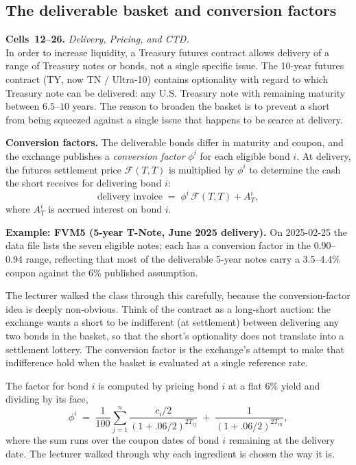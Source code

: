 \subsection{The deliverable basket and conversion factors}\label{L4-sec:tf-basket}

\begin{keyblock}
\textbf{Cells~12--26.} \emph{Delivery, Pricing, and CTD.}\\
In order to increase liquidity, a Treasury futures contract allows
delivery of a range of Treasury notes or bonds, not a single specific
issue. The 10-year futures contract (TY, now TN / Ultra-10) contains
optionality with regard to which Treasury note can be delivered: any U.S.
Treasury note with remaining maturity between $6.5$--$10$ years. The
reason to broaden the basket is to prevent a short from being squeezed
against a single issue that happens to be scarce at delivery.

\textbf{Conversion factors.} The deliverable bonds differ in maturity and
coupon, and the exchange publishes a \emph{conversion factor} $\phi^i$
for each eligible bond $i$. At delivery, the futures settlement price
$\mathcal{F}(T,T)$ is multiplied by $\phi^i$ to determine the cash the
short receives for delivering bond $i$:
\[
  \text{delivery invoice} \;=\; \phi^i\,\mathcal{F}(T,T) + A^i_T,
\]
where $A^i_T$ is accrued interest on bond $i$.

\textbf{Example: FVM5 (5-year T-Note, June 2025 delivery).} On
2025-02-25 the data file lists the seven eligible notes; each has a
conversion factor in the 0.90--0.94 range, reflecting that most of the
deliverable 5-year notes carry a 3.5--4.4\% coupon against the 6\%
published assumption.
\end{keyblock}

The lecturer walked the class through this carefully, because the
conversion-factor idea is deeply non-obvious. Think of the contract as a
long-short auction: the exchange wants a short to be indifferent (at
settlement) between delivering any two bonds in the basket, so that the
short's optionality does not translate into a settlement lottery. The
conversion factor is the exchange's attempt to make that indifference hold
when the basket is evaluated at a single reference rate.

The factor for bond $i$ is computed by pricing bond $i$ at a flat 6\% yield
and dividing by its face,
\[
  \phi^i \;=\; \frac{1}{100}\sum_{j=1}^n \frac{c_i/2}{(1+.06/2)^{2T_{ij}}}
                \;+\; \frac{1}{(1+.06/2)^{2T_{in}}},
\]
where the sum runs over the coupon dates of bond $i$ remaining at the
delivery date. The lecturer walked through why each ingredient is chosen
the way it is.

